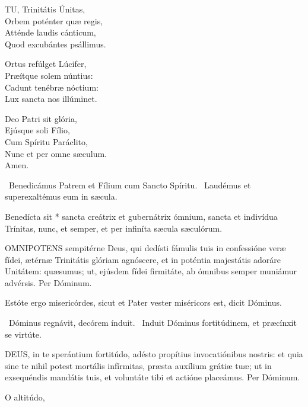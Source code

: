 \lettrine[lines=2]{T}{U}, Trinitátis Únitas,\\
Orbem poténter quæ regis,\\
Atténde laudis cánticum,\\
Quod excubántes psállimus.

Ortus refúlget Lúcifer,\\
Præítque solem núntius:\\
Cadunt tenébræ nóctium:\\
Lux sancta nos illúminet.

Deo Patri sit glória,\\
Ejúsque soli Fílio,\\
Cum Spíritu Paráclito,\\
Nunc et per omne sæculum.\\
Amen.

\V\ Benedicámus Patrem et Fílium cum Sancto Spíritu. \R\ Laudémus et superexaltémus eum in sæcula.

 Benedícta sit * sancta creátrix et gubernátrix ómnium, sancta et indivídua Trínitas, nunc, et semper, et per infiníta sæcula sæculórum.


\lettrine[lines=2]{O}{MNIPOTENS} sempitérne Deus, qui dedísti fámulis tuis in confessióne veræ fídei, ætérnæ Trinitátis glóriam agnóscere, et in poténtia majestátis adoráre Unitátem: quæsumus; ut, ejúsdem fídei firmitáte, ab ómnibus semper muniámur advérsis. Per Dóminum.


 Estóte ergo misericórdes, sicut et Pater vester miséricors est, dicit Dóminus.

\V\ Dóminus regnávit, decórem índuit. \R\ Induit Dóminus fortitúdinem, et præcínxit se virtúte.


\lettrine[lines=2]{D}{EUS}, in te sperántium fortitúdo, adésto propítius invocatiónibus nostris: et quia sine te nihil potest mortális infírmitas, præsta auxílium grátiæ tuæ; ut in exsequéndis mandátis tuis, et voluntáte tibi et actióne placeámus. Per Dóminum.



 O altitúdo, 

